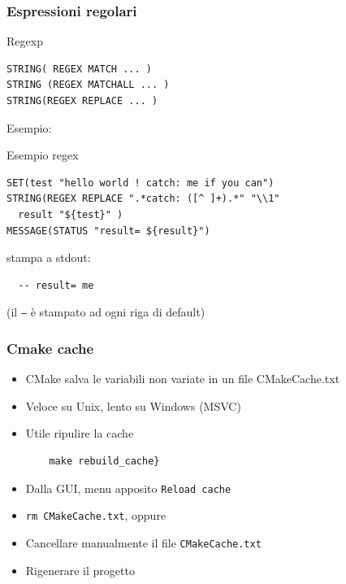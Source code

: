 \documentclass[10pt] {beamer}
\begin{document}

\begin{frame}[fragile]
\frametitle{ Espressioni regolari}

\begin{block}{Regexp}
\begin{verbatim}
STRING( REGEX MATCH ... )
STRING (REGEX MATCHALL ... )
STRING(REGEX REPLACE ... )
\end{verbatim}
\end{block}

Esempio:
\begin{block}{Esempio regex}
\begin{small}
\begin{verbatim}
SET(test "hello world ! catch: me if you can")
STRING(REGEX REPLACE ".*catch: ([^ ]+).*" "\\1" 
  result "${test}" )
MESSAGE(STATUS "result= ${result}")
\end{verbatim}
\end{small}
\end{block}
stampa a stdout:
\begin{verbatim}
  -- result= me
\end{verbatim}
(il \texttt{--} è stampato ad ogni riga di default)
\end{frame}



\begin{frame}[fragile]
\frametitle{Cmake cache}
\begin{itemize}
\item CMake salva le variabili non variate in un file CMakeCache.txt
\item Veloce su Unix, lento su Windows (MSVC)
\item Utile ripulire la cache

\begin{verbatim}
	make rebuild_cache}
\end{verbatim}
\item Dalla GUI, menu apposito \texttt{Reload cache}
\end{itemize}

\begin{itemize}
\item \texttt{rm CMakeCache.txt}, oppure
\item Cancellare manualmente il file \texttt{CMakeCache.txt}
\item Rigenerare il progetto
\end{itemize}

\end{frame}
\end{document}
